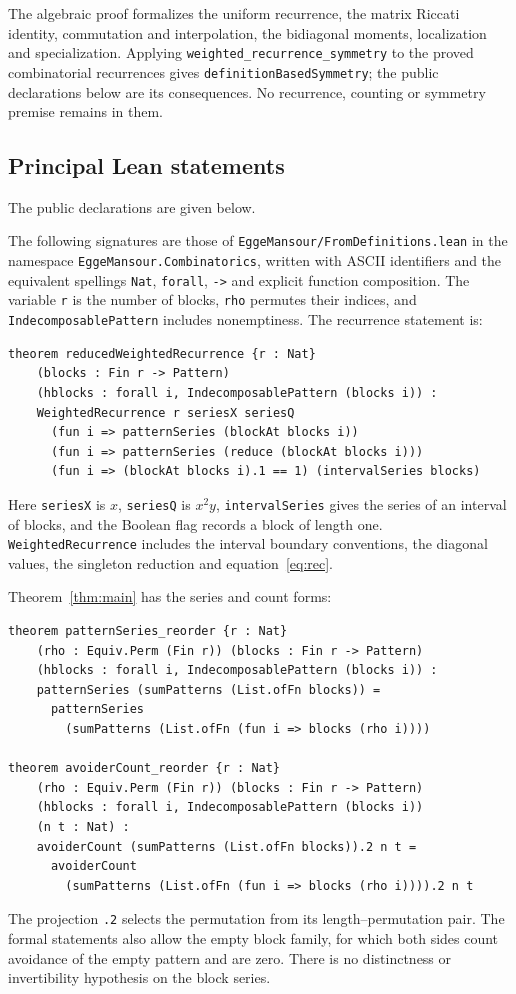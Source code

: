 \documentclass[11pt]{amsart}
\theoremstyle{definition}
\begin{document}
The algebraic proof formalizes the uniform recurrence, the matrix Riccati identity, commutation and interpolation, the bidiagonal moments, localization and specialization. Applying \texttt{weighted\_recurrence\_symmetry} to the proved combinatorial recurrences gives \texttt{definitionBasedSymmetry}; the public declarations below are its consequences. No recurrence, counting or symmetry premise remains in them.

\subsection{Principal Lean statements}
The public declarations are given below.

The following signatures are those of \texttt{EggeMansour/FromDefinitions.lean} in the namespace \texttt{EggeMansour.Combinatorics}, written with ASCII identifiers and the equivalent spellings \texttt{Nat}, \texttt{forall}, \texttt{->} and explicit function composition. The variable \texttt{r} is the number of blocks, \texttt{rho} permutes their indices, and \texttt{IndecomposablePattern} includes nonemptiness. The recurrence statement is:
\begin{small}
\begin{verbatim}
theorem reducedWeightedRecurrence {r : Nat}
    (blocks : Fin r -> Pattern)
    (hblocks : forall i, IndecomposablePattern (blocks i)) :
    WeightedRecurrence r seriesX seriesQ
      (fun i => patternSeries (blockAt blocks i))
      (fun i => patternSeries (reduce (blockAt blocks i)))
      (fun i => (blockAt blocks i).1 == 1) (intervalSeries blocks)
\end{verbatim}
\end{small}
Here \texttt{seriesX} is $x$, \texttt{seriesQ} is $x^2y$, \texttt{intervalSeries} gives the series of an interval of blocks, and the Boolean flag records a block of length one. \texttt{WeightedRecurrence} includes the interval boundary conventions, the diagonal values, the singleton reduction and equation~\eqref{eq:rec}.

Theorem~\ref{thm:main} has the series and count forms:
\begin{small}
\begin{verbatim}
theorem patternSeries_reorder {r : Nat}
    (rho : Equiv.Perm (Fin r)) (blocks : Fin r -> Pattern)
    (hblocks : forall i, IndecomposablePattern (blocks i)) :
    patternSeries (sumPatterns (List.ofFn blocks)) =
      patternSeries
        (sumPatterns (List.ofFn (fun i => blocks (rho i))))

theorem avoiderCount_reorder {r : Nat}
    (rho : Equiv.Perm (Fin r)) (blocks : Fin r -> Pattern)
    (hblocks : forall i, IndecomposablePattern (blocks i))
    (n t : Nat) :
    avoiderCount (sumPatterns (List.ofFn blocks)).2 n t =
      avoiderCount
        (sumPatterns (List.ofFn (fun i => blocks (rho i)))).2 n t
\end{verbatim}
\end{small}
The projection \texttt{.2} selects the permutation from its length--permutation pair. The formal statements also allow the empty block family, for which both sides count avoidance of the empty pattern and are zero. There is no distinctness or invertibility hypothesis on the block series.
\end{document}

